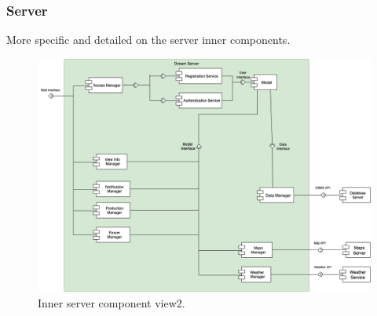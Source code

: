 \subsubsection{Server}
More specific and detailed on the server inner components.

\begin{figure}[H]
    \begin{center}
    \includegraphics[width=1\textwidth]{images/ServerComponent3.png}
    \caption{Inner server component view2.}
    \label{fig:server component view2}
    \end{center}
\end{figure}

